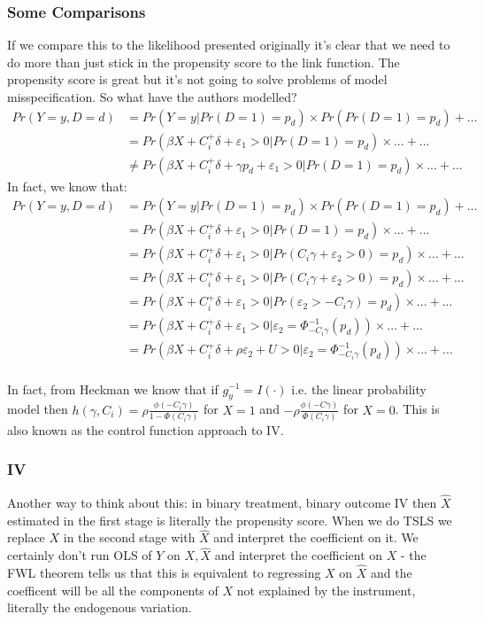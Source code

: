 \documentclass{article}
\begin{document}
\subsubsection*{Some Comparisons}
If we compare this to the likelihood presented originally it's clear that we need 
to do more than just stick in the propensity score to the link function. The 
propensity score is great but it's not going to solve 
problems of model misspecification. So what have the authors modelled?
\begin{align*}
    Pr(Y = y, D = d) &=  Pr(Y = y | Pr(D = 1) = p_d) \times Pr(Pr(D = 1) = p_d) + ...\\
    &= Pr(\beta X + C_i^+\delta + \varepsilon_1 > 0 | Pr(D = 1) = p_d) \times ...  + ...\\
    &\neq Pr(\beta X + C_i^+ \delta + \gamma p_d + \varepsilon_1 > 0 | Pr(D =  1) = p_d) \times ... + ...
\end{align*}
In fact, we know that:
\begin{align*}
    Pr(Y = y, D = d) &=  Pr(Y = y | Pr(D = 1) = p_d) \times Pr(Pr(D = 1) = p_d) + ...\\
    &= Pr(\beta X + C_i^+\delta + \varepsilon_1 > 0 | Pr(D = 1) = p_d) \times ... + ... \\
    &= Pr(\beta X + C_i^+\delta + \varepsilon_1 > 0 | Pr(C_i \gamma + \varepsilon_2 > 0) = p_d) \times ...  + ...\\
    &= Pr(\beta X + C_i^+\delta + \varepsilon_1 > 0 | Pr(C_i \gamma + \varepsilon_2 > 0) = p_d) \times ...  + ...\\
    &= Pr(\beta X + C_i^+\delta + \varepsilon_1 > 0 | Pr(\varepsilon_2 > -C_i \gamma) = p_d) \times ...  + ...\\
    &= Pr(\beta X + C_i^+\delta + \varepsilon_1 > 0 | \varepsilon_2  = \Phi^{-1}_{-C_i\gamma}\left(p_d\right)) \times ...  + ...\\
    &= Pr(\beta X + C_i^+\delta + \rho \varepsilon_2  + U > 0 | \varepsilon_2  = \Phi^{-1}_{-C_i\gamma}\left(p_d\right)) \times ...  + ...\\
\end{align*}




In fact, 
from Heckman we know that if $g_y^{-1} = I(\cdot)$ i.e. the linear probability model
then $h(\gamma, C_i) = \rho \frac{\phi(-C_i\gamma)}{1 - \Phi(C_i \gamma)}$ for $X = 1$ 
and $-\rho \frac{\phi(-C\gamma)}{\Phi(C_i \gamma)}$ for $X = 0$. This is also known 
as the control function approach to IV.

\subsubsection*{IV}
Another way to think about this: in binary treatment, binary outcome IV then $\hat{X}$ 
estimated in the first stage is literally the  propensity score. When we do TSLS 
we replace $X$ in the second stage with $\hat{X}$ and interpret the coefficient on it. 
We certainly don't run OLS of $Y$ on $X, \hat{X}$ and interpret the coefficient on 
$X$ - the FWL theorem tells us that this is equivalent to regressing $X$ on $\hat{X}$ and 
 the coefficent will be all the components of $X$ not explained by the instrument, 
 literally the endogenous variation.
\end{document}
